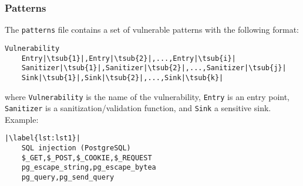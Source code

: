\subsubsection*{Patterns}
\label{sec:expr.patterns}

The \verb|patterns| file contains a set of vulnerable patterns with the
following format:

\begin{lstlisting}[label={lst:pat.tmpl},
        caption={Vulnerable pattern template}]
    Vulnerability
    Entry|\tsub{1}|,Entry|\tsub{2}|,...,Entry|\tsub{i}|
    Sanitizer|\tsub{1}|,Sanitizer|\tsub{2}|,...,Sanitizer|\tsub{j}|
    Sink|\tsub{1}|,Sink|\tsub{2}|,...,Sink|\tsub{k}|
\end{lstlisting}

where \verb|Vulnerability| is the name of the vulnerability, \verb|Entry| is an
entry point, \verb|Sanitizer| is a sanitization/validation function, and
\verb|Sink| a sensitive sink. Example:

\begin{lstlisting}[label={lst:pat.ex},
        caption={SQL Injection pattern, specific to PostgreSQL}]
    |\label{lst:lst1}|
    SQL injection (PostgreSQL)
    $_GET,$_POST,$_COOKIE,$_REQUEST
    pg_escape_string,pg_escape_bytea
    pg_query,pg_send_query
\end{lstlisting}
